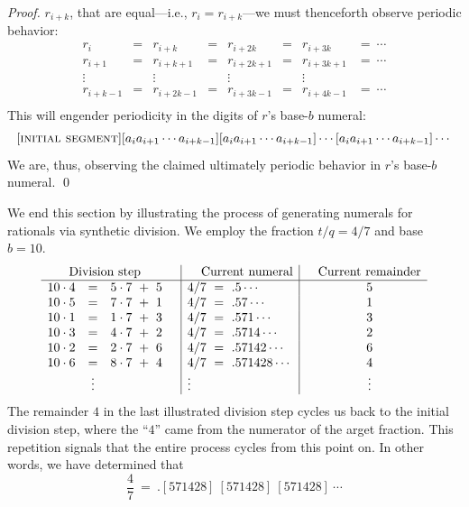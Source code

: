 \begin{proof}
$r_{i+k}$, that are equal---i.e., $r_i = r_{i+k}$---we must
thenceforth observe periodic behavior:
\[
\begin{array}{cccccccc}
r_i       & = & r_{i+k}    & = & r_{i+2k}   & = & r_{i+3k}   & = \ \cdots \\
r_{i+1}   & = & r_{i+k+1}  & = & r_{i+2k+1} & = & r_{i+3k+1} & = \ \cdots \\
\vdots    &   & \vdots     &   & \vdots     &   & \vdots     & \\
r_{i+k-1} & = & r_{i+2k-1} & = & r_{i+3k-1} & = & r_{i+4k-1} & = \ \cdots \\
\end{array}
\]
This will engender periodicity in the digits of $r$'s base-$b$ numeral:
\[ [\mbox{\sc initial segment}]
 [a_i a_{i+1} \cdots a_{i+k-1}]
          [a_i a_{i+1} \cdots a_{i+k-1}]
    \cdots  [a_i a_{i+1} \cdots a_{i+k-1}] \cdots 
\]
We are, thus, observing the claimed ultimately periodic behavior in
$r$'s base-$b$ numeral.
\qed
\end{proof}

\bigskip

We end this section by illustrating the process of generating numerals
for rationals via synthetic division.  We employ the fraction $t/q = 4/7$
and base $b = 10$.
\[
\begin{array}{lclc|l|cc}
\multicolumn{3}{c}{\mbox{Division step}} & &  \hspace*{.15in} \mbox{Current numeral} & &
\mbox{Current remainder} \\
\hline
10 \cdot 4   & = & 5 \cdot 7 \ + \ 5 &
      & 4/7 \ = \ .5 \cdots &
      & 5 \\
10 \cdot 5 & = & 7 \cdot 7 \ + \ 1 &
      & 4/7 \ = \ .57 \cdots &
      & 1 \\
10 \cdot 1 & = & 1 \cdot 7 \ + \ 3 &
      & 4/7 \ = \ .571 \cdots &
      & 3 \\
10 \cdot 3 & = & 4 \cdot 7 \ + \ 2 &
      & 4/7 \ = \ .5714 \cdots &
      & 2 \\
10 \cdot 2 & = & 2 \cdot 7 \ + \ 6 &
      & 4/7 \ = \ .57142 \cdots &
      & 6 \\
10 \cdot 6 & = & 8 \cdot 7 \ + \ 4 &
      & 4/7 \ = \ .571428 \cdots &
      & 4 \\
 & \vdots & & & \vdots & & \vdots
\end{array}
\]
The remainder $4$ in the last illustrated division step cycles us back
to the initial division step, where the ``$4$'' came from the
numerator of the arget fraction.  This repetition signals that the
entire process cycles from this point on.  In other words, we have
determined that
\[ \frac{4}{7} \ = \ .[571428] \ [571428] \ [571428] \ \cdots \]


